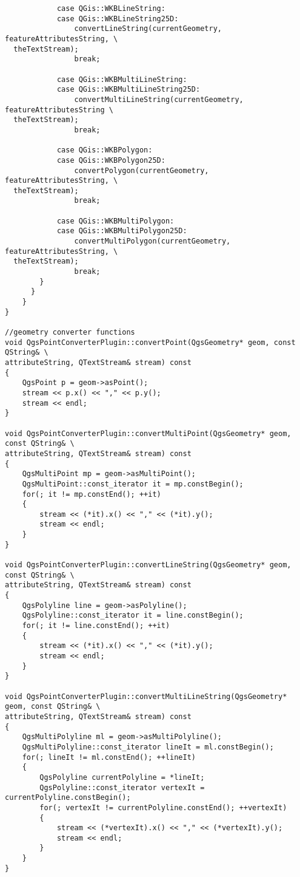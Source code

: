 \begin{verbatim}
            case QGis::WKBLineString:
            case QGis::WKBLineString25D:
                convertLineString(currentGeometry, featureAttributesString, \
  theTextStream);
                break;

            case QGis::WKBMultiLineString:
            case QGis::WKBMultiLineString25D:
                convertMultiLineString(currentGeometry, featureAttributesString \
  theTextStream);
                break;

            case QGis::WKBPolygon:
            case QGis::WKBPolygon25D:
                convertPolygon(currentGeometry, featureAttributesString, \
  theTextStream);
                break;

            case QGis::WKBMultiPolygon:
            case QGis::WKBMultiPolygon25D:
                convertMultiPolygon(currentGeometry, featureAttributesString, \
  theTextStream);
                break;
        }
      }
    }
}

//geometry converter functions
void QgsPointConverterPlugin::convertPoint(QgsGeometry* geom, const QString& \
attributeString, QTextStream& stream) const
{
    QgsPoint p = geom->asPoint();
    stream << p.x() << "," << p.y();
    stream << endl;
}

void QgsPointConverterPlugin::convertMultiPoint(QgsGeometry* geom, const QString& \
attributeString, QTextStream& stream) const
{
    QgsMultiPoint mp = geom->asMultiPoint();
    QgsMultiPoint::const_iterator it = mp.constBegin();
    for(; it != mp.constEnd(); ++it)
    {
        stream << (*it).x() << "," << (*it).y();
        stream << endl;
    }
}

void QgsPointConverterPlugin::convertLineString(QgsGeometry* geom, const QString& \
attributeString, QTextStream& stream) const
{
    QgsPolyline line = geom->asPolyline();
    QgsPolyline::const_iterator it = line.constBegin();
    for(; it != line.constEnd(); ++it)
    {
        stream << (*it).x() << "," << (*it).y();
        stream << endl;
    }
}

void QgsPointConverterPlugin::convertMultiLineString(QgsGeometry* geom, const QString& \
attributeString, QTextStream& stream) const
{
    QgsMultiPolyline ml = geom->asMultiPolyline();
    QgsMultiPolyline::const_iterator lineIt = ml.constBegin();
    for(; lineIt != ml.constEnd(); ++lineIt)
    {
        QgsPolyline currentPolyline = *lineIt;
        QgsPolyline::const_iterator vertexIt = currentPolyline.constBegin();
        for(; vertexIt != currentPolyline.constEnd(); ++vertexIt)
        {
            stream << (*vertexIt).x() << "," << (*vertexIt).y();
            stream << endl;
        }
    }
}


\end{verbatim}
